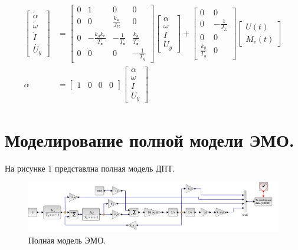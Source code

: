 \documentclass[a4paper, 11pt]{article}
\begin{document}
\begin{align}
    \begin{bmatrix}
        \dot{\alpha} \\
        \dot{\omega} \\
        \dot{I} \\
        \dot{U_y} 
    \end{bmatrix} & = 
    \begin{bmatrix}
        0 & 1 & 0 & 0 \\
        0 & 0 & \frac{k_\text{м}}{J_\Sigma} & 0 \\
        0 & -\frac{k_\text{д}k_e}{T_\text{я}} & - \frac{1}{T_\text{я}} & \frac{k_\text{д}}{T_\text{я}} \\
        0 & 0 & 0 & -\frac{1}{T_y}
    \end{bmatrix}
    \begin{bmatrix}
        \alpha \\
        \omega \\
        I \\
        U_y 
    \end{bmatrix} + 
    \begin{bmatrix}
        0 & 0 \\
        0 & - \frac{1}{J_\Sigma} \\
        0 & 0 \\
        \frac{k_y}{T_y} & 0
    \end{bmatrix}
    \begin{bmatrix}
        U(t) \\
        M_c(t)
    \end{bmatrix} \\
    \alpha & = 
    \begin{bmatrix}
        1 & 0 & 0 & 0
    \end{bmatrix}
    \begin{bmatrix}
        \alpha \\
        \omega \\
        I \\
        U_y 
    \end{bmatrix}
\end{align}

\section*{Моделирование полной модели ЭМО.}

На рисунке 1 представлна полная модель ДПТ.
\begin{figure}[h!]
    \centering
    \includegraphics[width = \textwidth]{../images/FullModel/full-model.pdf}
    \caption{Полная модель ЭМО.}
\end{figure}
\end{document}
